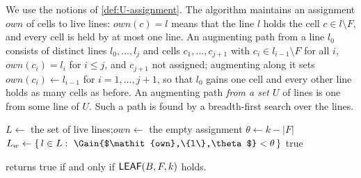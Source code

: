 We use the notions of \cref{def:U-assignment}. The algorithm maintains an assignment $\mathit{own}$ of cells
to live lines: $\mathit{own}(c)=l$ means that the line $l$ holds the cell $c\in l\setminus F$, and every
cell is held by at most one line. An augmenting path from a line $l_0$ consists of distinct lines
$l_0,\dots,l_j$ and cells $c_1,\dots,c_{j+1}$ with $c_i\in l_{i-1}\setminus F$ for all $i$,
$\mathit{own}(c_i)=l_i$ for $i\le j$, and $c_{j+1}$ not assigned; augmenting along it sets
$\mathit{own}(c_i)\gets l_{i-1}$ for $i=1,\dots,j+1$, so that $l_0$ gains one cell and every other line holds
as many cells as before. An augmenting path \emph{from a set $U$} of lines is one from some line of $U$.
Such a path is found by a breadth-first search over the lines.

\begin{algorithm}[t]
\DontPrintSemicolon
{}
$L\gets$ the set of live lines;\quad $\mathit{own}\gets$ the empty assignment\;
$\theta\gets k-|F|$\;
$L_w\gets\{\,l\in L:\ \Gain{$\mathit{own},\{l\},\theta$}<\theta\,\}$ 
\Return true\;
\BlankLine
{}
\caption{The test $\LEAF(B,F,k)$ by integer max-flow.}
\label{alg:leaf}
\end{algorithm}

\begin{proposition}\label{prop:leaf-correct}
 returns true if and only if $\LEAF(B,F,k)$ holds.
\end{proposition}
\nopagebreak

